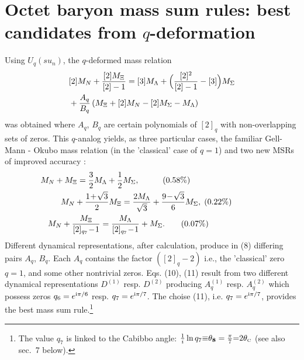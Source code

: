 \documentclass[twoside]{article}
\newcommand{\scr}{\rm\scriptscriptstyle}
\begin{document}
\section{Octet baryon mass sum rules:
         best candidates from $q$-deformation}
Using $U_q(su_n)$, the $q$-deformed mass relation
\begin{eqnarray}
\vspace{-0.6mm}
   {} & [2]M_N+\frac{[2] M_{\Xi}}{[2]-1} = [3] M_{\Lambda }
+ \Bigl ( \frac{[2]^2}{[2]-1}-[3]  \Bigr )
          M_{\Sigma }                            \nonumber \\
  {} &  +\frac{A_q}{B_q}\left( M_{\Xi } + [2] M_N -
   [2]M_{\Sigma } - M_{\Lambda } \right)             \label{(8)}
 \end{eqnarray}
was obtained  \cite{ga-bre,ga-uzh} where $A_q$, $B_q$ are certain
polynomials of $[2]_q$ with non-overlapping sets of zeros.
This $q$-analog  yields, as three particular cases, the familiar
Gell-Mann - Okubo mass relation (in the 'classical' case of $q=1$)
and two new MSRs of improved accuracy    \cite{ga-bre,ga-uzh,ga-io}:
\vspace{0.6mm}
\begin{eqnarray}
 & \hspace{-9.8mm}   M_N+M_\Xi=\frac32 M_\Lambda+
\frac12M_\Sigma ,  \hspace{10mm} (0.58\%)  \hspace{-4mm}
                                                       \label{(9)} \\
 & \hspace{-1.1mm} M_N+\frac{1\!+\!\sqrt{3}}{2}M_\Xi=
                    \frac{2 M_\Lambda}{\sqrt{3}}+
\frac{9\!-\!\sqrt{3}}{6}M_\Sigma ,    \hspace{1mm} (0.22\%) \ \ \
                                                        \label{(10)} \\
 & \hspace{-6.7mm} M_N+\frac{M_{\Xi}}{[2]_{q_7}\!-\!1}=
\frac{M_{\Lambda}}{[2]_{q_7}\!-\!1}+M_{\Sigma} .
         \hspace{7mm}  (0.07\%)  \hspace{-0.5mm}        \label{(11)}
\end{eqnarray}
\vspace{0.6mm}
Different dynamical representations, after calculation,
produce in (8) differing pairs $A_q$, $B_q$.
Each $A_q$ contains the factor $([2]_q-2)$ i.e.,
the 'classical' zero $q=1$, and some other nontrivial zeros.
Eqs. (10), (11) result from two different dynamical representations
$D^{(1)}$ resp. $D^{(2)}$ producing $A_q^{(1)}$ resp. $A_q^{(2)}$
which possess zeros $q_6=e^{{\rm i}\pi/6}$ resp. $q_7=e^{{\rm i}\pi/7}$.
The choise (11), i.e. $q_7=e^{{\rm i}\pi/7}$, provides the best
mass sum rule.\footnote{
The value $q_7$ is linked \cite{ga-uzh,ARW} to the Cabibbo angle:
$\frac1i\ln{q_7}{\equiv}\theta_{\bf 8}=
\frac{\pi}{7}{=}2\theta_{\scr{C}}$ (see also sec.~7 below).}
\end{document}
